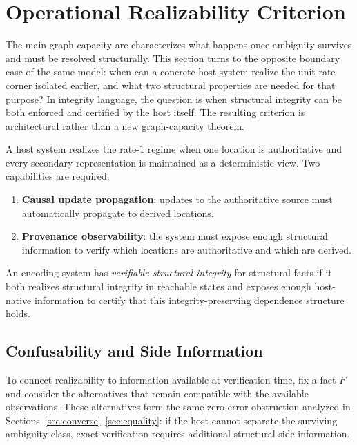 \section{Operational Realizability Criterion}\label{sec:requirements}

The main graph-capacity arc characterizes what happens once ambiguity survives and must be resolved structurally. This section turns to the opposite boundary case of the same model: when can a concrete host system realize the unit-rate corner isolated earlier, and what two structural properties are needed for that purpose? In integrity language, the question is when structural integrity can be both enforced and certified by the host itself. The resulting criterion is architectural rather than a new graph-capacity theorem.

A host system realizes the rate-$1$ regime when one location is authoritative and every secondary representation is maintained as a deterministic view. Two capabilities are required:
\begin{enumerate}
\item \textbf{Causal update propagation}: updates to the authoritative source must automatically propagate to derived locations.
\item \textbf{Provenance observability}: the system must expose enough structural information to verify which locations are authoritative and which are derived.
\end{enumerate}

\begin{definition}\label{def:verifiable-integrity}
An encoding system has \emph{verifiable structural integrity} for structural facts if it both realizes structural integrity in reachable states and exposes enough host-native information to certify that this integrity-preserving dependence structure holds.
\end{definition}

\subsection{Confusability and Side Information}\label{sec:confusability}

To connect realizability to information available at verification time, fix a fact $F$ and consider the alternatives that remain compatible with the available observations. These alternatives form the same zero-error obstruction analyzed in Sections~\ref{sec:converse}--\ref{sec:equality}: if the host cannot separate the surviving ambiguity class, exact verification requires additional structural side information.


